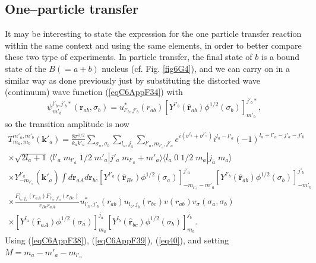 \subsection{One--particle transfer}
It may be interesting to state the expression for the one particle transfer reaction within the same context and using the same elements, in order to better compare these two type of experiments. In particle transfer, the final state of $b$ is a bound state of the $B(=a+b)$ nucleus (cf. Fig. \ref{fig6G4}), and we can carry on in a similar way as done previously just by substituting the distorted wave (continuum) wave function (\ref{eqC6AppF34}) with
 \begin{equation}\label{eqC6AppG57}
\psi_{m'_b}^{l'_b,j'_b*}(\mathbf{r}_{ab},\sigma_b)=u^*_{l'_b,j'_b}(r_{ab})\left[ Y^{l'_b} (\hat {\mathbf{r}}_{ab})\phi^{1/2}(\sigma_b)\right]^{j'_b*}_{m'_b},
\end{equation}
so the transition amplitude is now
\begin{multline}\label{eqC6AppG58}
T_{m_a,m_b}^{m'_a,m'_b}(\mathbf{k}'_a)=\frac{8\pi^{3/2}}{k_ak'_a}\sum_{\sigma_a,\sigma_b}\sum_{l_a,j_a}\sum_{l'_a,m_{l'_a},j'_a}
 e^{i(\sigma^{l_a}+\sigma^{l'_a})}i^{l_a-l'_a}(-1)^{l_a+l'_a-j'_a-j'_b}\\
\times \sqrt{2l_a+1}\,\langle l'_a\;m_{l'_a}\;1/2\;m'_a|j'_a\;m_{l'_a}+m'_a\rangle \langle l_a\;0\;1/2\;m_a|j_a\;m_a\rangle\\
\times Y^{l'_a}_{-m_{l'_a}} (\hat {\mathbf{k}}'_a)
\int d\mathbf{r}_{aA}d \mathbf{r}_{bc}\left[ Y^{l'_a} (\hat {\mathbf{r}}_{Bc})\phi^{1/2}(\sigma_a)\right]^{j'_a}_{-m_{l'_a}-m'_a}\left[ Y^{l'_b} (\hat {\mathbf{r}}_{ab})\phi^{1/2}(\sigma_b)\right]^{j'_b}_{-m'_b}\\
\times \frac{F_{l_a,j_a}(r_{aA})  F_{l'_a,j'_a}(r_{Bc})}{r_{Bc}r_{aA}}u^*_{l'_b,j'_b}(r_{ab})u_{l_b,j_b}(r_{bc})v(r_{ab})v_\sigma(\sigma_a,\sigma_b)\\
\times\left[ Y^{l_a} (\hat {\mathbf{r}}_{aA})\phi^{1/2}(\sigma_a)\right]^{j_a}_{m_a}\left[ Y^{l_b} (\hat {\mathbf{r}}_{bc})\phi^{1/2}(\sigma_b)\right]^{j_b}_{m_b}.
\end{multline}
Using (\ref{eqC6AppF38}), (\ref{eqC6AppF39}), (\ref{eq40}), and setting $M=m_a-m'_a-m_{l'_a}$
